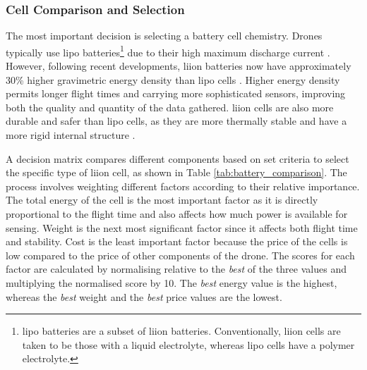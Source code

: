 \subsubsection{Cell Comparison and Selection}

The most important decision is selecting a battery cell chemistry. Drones typically use \gls{lipo} batteries\footnote{\acrshort{lipo} batteries are a subset of \acrshort{liion} batteries. Conventionally, \acrshort{liion} cells are taken to be those with a liquid electrolyte, whereas \acrshort{lipo} cells have a polymer electrolyte.} due to their high maximum discharge current \cite{10808488}. However, following recent developments, \gls{liion} batteries now have approximately 30\% higher gravimetric energy density than \acrshort{lipo} cells  \cite{Agrawal_2008}. Higher energy density permits longer flight times and carrying more sophisticated sensors, improving both the quality and quantity of the data gathered. \acrshort{liion} cells are also more durable and safer than \acrshort{lipo} cells, as they are more thermally stable and have a more rigid internal structure \cite{bergveld2014battery}.

A decision matrix compares different components based on set criteria to select the specific type of \acrshort{liion} cell, as shown in Table \ref{tab:battery_comparison}. The process involves weighting different factors according to their relative importance. The total energy of the cell is the most important factor as it is directly proportional to the flight time and also affects how much power is available for sensing. Weight is the next most significant factor since it affects both flight time and stability. Cost is the least important factor because the price of the cells is low compared to the price of other components of the drone. The scores for each factor are calculated by normalising relative to the \textit{best} of the three values and multiplying the normalised score by 10. The \textit{best} energy value is the highest, whereas the \textit{best} weight and the \textit{best} price values are the lowest. 

